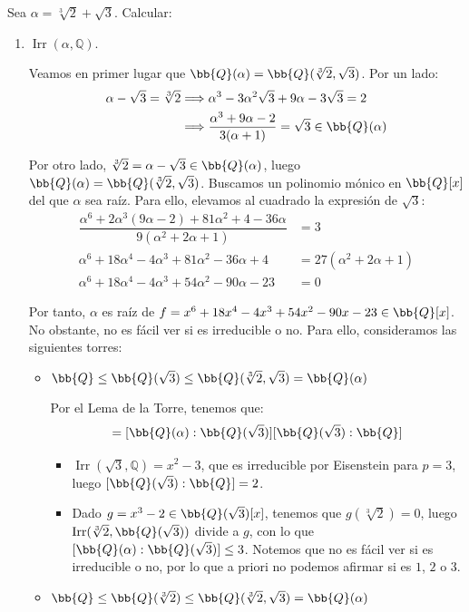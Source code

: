 \documentclass[12pt]{article}
\DeclareMathOperator{\Irr}{Irr}
\begin{document}
\begin{ejercicio}
    Sea $\alpha=\sqrt[3]{2}+\sqrt{3}$. Calcular:
    \begin{enumerate}
        \item $\Irr(\alpha,\mathbb{Q})$.
        
        Veamos en primer lugar que $\bb{Q}(\alpha) = \bb{Q}(\sqrt[3]{2},\sqrt{3})$. Por un lado:
        \begin{align*}
            \alpha-\sqrt{3} = \sqrt[3]{2} &\Longrightarrow
            \alpha^3 - 3\alpha^2\sqrt{3} + 9\alpha - 3\sqrt{3} = 2\\
            &\Longrightarrow \dfrac{\alpha^3 + 9\alpha - 2}{3(\alpha+1)} = \sqrt{3} \in \bb{Q}(\alpha)
        \end{align*}

        Por otro lado, $\sqrt[3]{2} = \alpha - \sqrt{3} \in \bb{Q}(\alpha)$, luego $\bb{Q}(\alpha) = \bb{Q}(\sqrt[3]{2},\sqrt{3})$. Buscamos un polinomio mónico en $\bb{Q}[x]$ del que $\alpha$ sea raíz. Para ello, elevamos al cuadrado la expresión de $\sqrt{3}$:
        \begin{align*}
            \dfrac{\alpha^6+2\alpha^3(9\alpha-2)+81\alpha^2+4-36\alpha}{9(\alpha^2+2\alpha+1)} &= 3 \\
            \alpha^6 + 18\alpha^4 - 4\alpha^3 + 81\alpha^2 - 36\alpha + 4 &= 27(\alpha^2+2\alpha+1) \\
            \alpha^6 + 18\alpha^4 - 4\alpha^3 + 54\alpha^2 - 90\alpha - 23 &= 0
        \end{align*}

        Por tanto, $\alpha$ es raíz de $f = x^6 + 18x^4 - 4x^3 + 54x^2 - 90x - 23\in \bb{Q}[x]$. No obstante, no es fácil ver si es irreducible o no. Para ello, consideramos las siguientes torres:
        \begin{itemize}
            \item $\bb{Q} \leq \bb{Q}(\sqrt{3}) \leq \bb{Q}(\sqrt[3]{2},\sqrt{3}) = \bb{Q}(\alpha)$
            
            Por el Lema de la Torre, tenemos que:
            \begin{equation*}
                [\bb{Q}(\alpha):\bb{Q}] = [\bb{Q}(\alpha):\bb{Q}(\sqrt{3})][\bb{Q}(\sqrt{3}):\bb{Q}]
            \end{equation*}
            \begin{itemize}
                \item $\Irr(\sqrt{3},\mathbb{Q}) = x^2-3$, que es irreducible por Eisenstein para $p=3$, luego $[\bb{Q}(\sqrt{3}):\bb{Q}] = 2$.
                \item Dado $g=x^3-2\in \bb{Q}(\sqrt{3})[x]$, tenemos que $g(\sqrt[3]{2}) = 0$, luego $\Irr(\sqrt[3]{2},\bb{Q}(\sqrt{3}))$ divide a $g$, con lo que $[\bb{Q}(\alpha):\bb{Q}(\sqrt{3})] \leq 3$. Notemos que no es fácil ver si es irreducible o no, por lo que a priori no podemos afirmar si es $1$, $2$ o $3$.
            \end{itemize}
            \item $\bb{Q} \leq \bb{Q}(\sqrt[3]{2}) \leq \bb{Q}(\sqrt[3]{2},\sqrt{3}) = \bb{Q}(\alpha)$
            

\end{itemize}
\end{enumerate}
\end{ejercicio}
\end{document}
